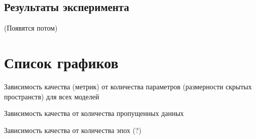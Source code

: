\documentclass{article}
\begin{document}
\subsection{Результаты эксперимента}

(Появятся потом)


\section{Список графиков}

Зависимость качества (метрик) от количества параметров (размерности скрытых пространств) для всех моделей

Зависимость качества от количества пропущенных данных

Зависимость качества от количества эпох (?)









\end{document}
